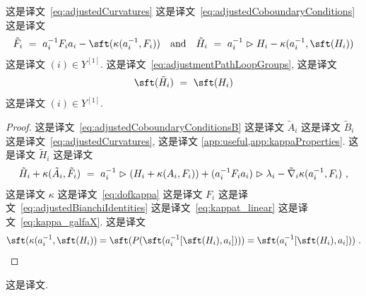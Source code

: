 \documentclass[
    affil-it, %
    auth-lg, %
    british, %
    compression, %
    contents, %
    custom-packages={}, %
    references={bigone}, %
]{lib/preprint}
\begin{document}
\begin{body}
        \begin{proposition}\label{prop:adjustedCurvatureGaugeTransformation}  这是译文~\eqref{eq:adjustedCurvatures} 这是译文~\eqref{eq:adjustedCoboundaryConditions} 这是译文             \begin{equation}\label{eq:adjustedCurvatureGaugeTransformation}
                \tilde F_i\ =\ a_i^{-1}F_ia_i-\sft(\kappa(a_i^{-1},F_i))
                \eand
                \tilde H_i\ =\ a_i^{-1}\acton H_i-\kappa(a_i^{-1},\sft(H_i))
            \end{equation}  这是译文 $(i)\in Y^{[1]}$. 这是译文~\eqref{eq:adjustmentPathLoopGroups}, 这是译文             \begin{equation}
				\sft(\tilde H_i)\ =\ \sft(H_i)
			\end{equation}  这是译文 $(i)\in Y^{[1]}$.
        \end{proposition}

        \begin{proof}
            这是译文~\eqref{eq:adjustedCoboundaryConditionsB} 这是译文 $\tilde A_i$ 这是译文 $\tilde B_i$ 这是译文~\eqref{eq:adjustedCurvatures}, 这是译文 \cref{app:useful,app:kappaProperties}. 这是译文 $\tilde H_i$ 这是译文             \begin{equation}
            	\tilde H_i+\kappa(\tilde A_i, \tilde F_i)\ =\ a^{-1}_i\vartriangleright(H_i+\kappa(A_i,F_i))+(a_i^{-1}F_i a_i)\vartriangleright\lambda_i-\tilde\nabla_i\kappa(a_i^{-1},F_i)~,
            \end{equation}  这是译文 $\kappa$ 这是译文~\eqref{eq:dofkappa} 这是译文 $F_i$ 这是译文~\eqref{eq:adjustedBianchiIdentities} 这是译文~\eqref{eq:kappat_linear} 这是译文~\eqref{eq:kappa_galfaX}. 这是译文 
            \begin{equation}
                \sft(\kappa(a_i^{-1},\sft(H_i))=\sft(P(\sft(a_i^{-1}[\sft(H_i),a_i])))=\sft(a_i^{-1}[\sft(H_i),a_i]))~.
			\end{equation}
        \end{proof}

这是译文.


\end{body}
\end{document}
